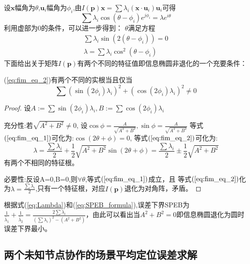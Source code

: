 设$\bm{x}$幅角为$\theta$,$\bm{u}_i$幅角为$\phi_i$,由$I(\bm{p})\bm{x}=\sum \lambda_i (\bm{x}\cdot\bm{u}_i)\bm{u}_i$可得
\begin{equation}
\sum \lambda_i \cos(\theta-\phi_i)e^{j\phi_i}=\lambda e^{i\theta}
\end{equation}
利用虚部为0的条件，可以进一步得到：
$\theta$满足方程
\begin{eqnarray}\label{eq:fim_eq_1}
\sum \lambda_i \sin(2(\theta-\phi_i))=0\\
\lambda=\sum \lambda_i \cos^2(\theta-\phi_i)\label{eq:fim_eq_2}
\end{eqnarray}
下面给出关于矩阵$I(\bm{p})$有两个不同的特征值即信息椭圆非退化的一个充要条件：
\begin{theorem}
(\ref{eq:fim_eq_2})有两个不同的实根当且仅当\[
\sum (\sin(2\phi_i)\lambda_i)^2+(\cos(2\phi_i)\lambda_i)^2 \neq 0\]
\end{theorem}

\begin{proof}
设$A:=\sum\sin(2\phi_i)\lambda_i,B:=\sum\cos(2\phi_i)\lambda_i$

充分性:若$\sqrt{A^2+B^2} \neq 0$,
设$\cos\phi=\frac{A}{\sqrt{A^2+B^2}},\sin\phi=\frac{A}{\sqrt{A^2+B^2}}$
等式$(\ref{eq:fim_eq_1})$可化为:$\cos(2\theta+\phi)=0$,
等式$(\ref{eq:fim_eq_2})$可化为:
\begin{equation}\label{eq:Lambda}
\lambda=\frac{\sum \lambda_i}{2}+\frac{1}{2}\sqrt{A^2+B^2}\sin(2\theta+\phi)=\frac{\sum \lambda_i}{2}\pm\frac{1}{2}\sqrt{A^2+B^2}
\end{equation}
有两个不相同的特征根。

必要性:反设A=0,B=0,则$\forall \theta$,等式$(\ref{eq:fim_eq_1})$成立，且
等式$(\ref{eq:fim_eq_2})$化为$\lambda=\frac{\sum \lambda_i}{2}$,只有一个特征根，对应$I(\bm{p})$退化为对角阵，矛盾。
\end{proof}
根据式(\ref{eq:Lambda})和(\ref{eq:SPEB_formula}),误差下界SPEB为$\frac{1}{\tilde{\lambda_1}}+\frac{1}{\tilde{\lambda_2}}=\frac{2\sum \lambda_i}{(\sum \lambda_i)^2-(A^2+B^2)}$，由此可以看出当$A^2+B^2=0$即信息椭圆退化为圆时误差下界最小。

\subsection{两个未知节点协作的场景平均定位误差求解}\label{subsection:two_node_cooperation}

